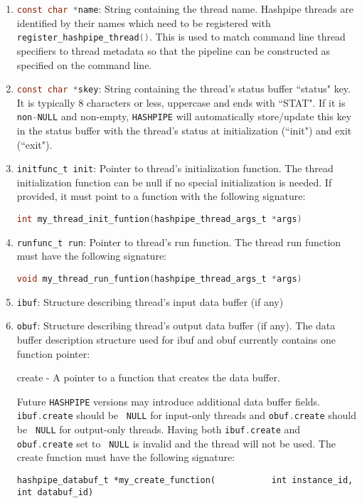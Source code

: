 \documentclass[12pt]{article}
\def\clst{\lstinline[basicstyle=\ttfamily,breaklines=true,language=C]}
\begin{document}
\begin{enumerate}
\item \clst{const char *name}: String containing the thread name. Hashpipe threads are 
identified by their names which need to be registered with 
\clst{register_hashpipe_thread()}. This is used to match command 
line thread specifiers to thread metadata so that the pipeline can be 
constructed as specified on the command line.

\item \clst{const char *skey}: String containing the thread's status 
buffer ``status" key. It is typically 8 characters or less, uppercase and 
ends with ``STAT". If it is \clst{non-NULL} and non-empty, \clst{HASHPIPE} 
will automatically store/update this key in the status buffer with the 
thread's status at initialization (``init") and exit (``exit").

\item \clst{initfunc_t init}: Pointer to thread's initialization function. The thread 
initialization function can be null if no special initialization is needed.  
If provided, it must point to a function with the following signature:

\clst{int my_thread_init_funtion(hashpipe_thread_args_t *args) }

\item \clst{runfunc_t run}: Pointer to thread's run function. The thread run 
function must have the following signature:

\clst{void my_thread_run_funtion(hashpipe_thread_args_t *args) }

\item \clst{ibuf}: Structure describing thread's input data buffer (if any)

\item \clst{obuf}: Structure describing thread's output data buffer (if any). The 
data buffer description structure used for ibuf and obuf currently contains 
one function pointer:

create - A pointer to a function that creates the data buffer.

Future \clst{HASHPIPE} versions may introduce additional data buffer fields. 
\clst{ibuf.create} should be \clst{ NULL} for input-only threads and 
\clst{obuf.create} should be \clst{ NULL} for output-only threads.  
Having both \clst{ibuf.create} and \clst{ obuf.create} set to \clst{ NULL} is 
invalid and the thread will not be used. The create function must have the 
following signature:

\begin{lstlisting}
hashpipe_databuf_t *my_create_function(           int instance_id, int databuf_id)
\end{lstlisting}
\end{enumerate}
\end{document}
